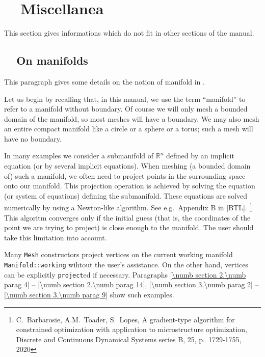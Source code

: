 
\chapter{~~Miscellanea}\label{\numb section 8}

This section gives informations which do not fit in other sections of the manual.


\section{~~On manifolds}\label{\numb section 8.\numb parag 1}

This paragraph gives some details on the notion of manifold in \maniFEM.

Let us begin by recalling that, in this manual, we use the term ``manifold'' to refer to
a manifold without boundary.
Of course we will only mesh a bounded domain of the manifold, so most meshes will have a boundary.
We may also mesh an entire compact manifold like a circle or a sphere or a torus;
such a mesh will have no boundary.

In many examples we consider a submanifold of $ \mathbb{R}^n $ defined by an implicit equation
(or by several implicit equations).
When meshing (a bounded domain of) such a manifold, we often need to project points in
the surrounding space onto our manifold. This projection operation is achieved by solving
the equation (or system of equations) defining the submanifold.
These equations are solved numerically by using a Newton-like algorithm.
See e.g.\ Appendix B in [BTL].%
\footnote{C.~Barbarosie, A.M.~Toader, S.~Lopes, A gradient-type algorithm for constrained
optimization with application to microstructure optimization, Discrete and Continuous Dynamical
Systems series B, 25, p.\ 1729-1755, 2020}
This algoritm converges only if the initial guess (that is, the coordinates of the point we are
trying to project) is close enough to the manifold.
The user should take this limitation into account.

Many {\small\tt Mesh} constructors project vertices on the current working manifold
{\small\tt Manifold::working} wihtout the user's assistance.
On the other hand, vertices can be explicitly {\small\tt project}ed if necessary.
Paragraphs \ref{\numb section 2.\numb parag 4} -- \ref{\numb section 2.\numb parag 14},
\ref{\numb section 3.\numb parag 2} -- \ref{\numb section 3.\numb parag 9} show such examples.
